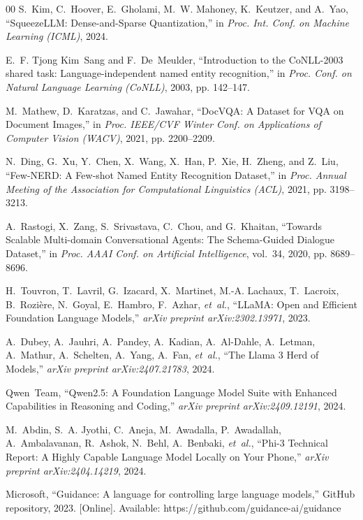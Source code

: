 \documentclass[conference]{IEEEtran}
\begin{document}
{\begin{thebibliography}{00}
S.~Kim, C.~Hoover, E.~Gholami, M.~W. Mahoney, K.~Keutzer, and A.~Yao, ``SqueezeLLM: Dense-and-Sparse Quantization,'' in \emph{Proc. Int. Conf. on Machine Learning (ICML)}, 2024.

E.~F. Tjong Kim~Sang and F.~De~Meulder, ``Introduction to the CoNLL-2003 shared task: Language-independent named entity recognition,'' in \emph{Proc. Conf. on Natural Language Learning (CoNLL)}, 2003, pp. 142--147.

M.~Mathew, D.~Karatzas, and C.~Jawahar, ``DocVQA: A Dataset for VQA on Document Images,'' in \emph{Proc. IEEE/CVF Winter Conf. on Applications of Computer Vision (WACV)}, 2021, pp. 2200--2209.

N.~Ding, G.~Xu, Y.~Chen, X.~Wang, X.~Han, P.~Xie, H.~Zheng, and Z.~Liu, ``Few-NERD: A Few-shot Named Entity Recognition Dataset,'' in \emph{Proc. Annual Meeting of the Association for Computational Linguistics (ACL)}, 2021, pp. 3198--3213.

A.~Rastogi, X.~Zang, S.~Srivastava, C.~Chou, and G.~Khaitan, ``Towards Scalable Multi-domain Conversational Agents: The Schema-Guided Dialogue Dataset,'' in \emph{Proc. AAAI Conf. on Artificial Intelligence}, vol.~34, 2020, pp. 8689--8696.

H.~Touvron, T.~Lavril, G.~Izacard, X.~Martinet, M.-A. Lachaux, T.~Lacroix, B.~Rozi{\`e}re, N.~Goyal, E.~Hambro, F.~Azhar, \emph{et~al.}, ``LLaMA: Open and Efficient Foundation Language Models,'' \emph{arXiv preprint arXiv:2302.13971}, 2023.

A.~Dubey, A.~Jauhri, A.~Pandey, A.~Kadian, A.~Al-Dahle, A.~Letman, A.~Mathur, A.~Schelten, A.~Yang, A.~Fan, \emph{et~al.}, ``The Llama 3 Herd of Models,'' \emph{arXiv preprint arXiv:2407.21783}, 2024.

Qwen~Team, ``Qwen2.5: A Foundation Language Model Suite with Enhanced Capabilities in Reasoning and Coding,'' \emph{arXiv preprint arXiv:2409.12191}, 2024.

M.~Abdin, S.~A. Jyothi, C.~Aneja, M.~Awadalla, P.~Awadallah, A.~Ambalavanan, R.~Ashok, N.~Behl, A.~Benbaki, \emph{et~al.}, ``Phi-3 Technical Report: A Highly Capable Language Model Locally on Your Phone,'' \emph{arXiv preprint arXiv:2404.14219}, 2024.

Microsoft, ``Guidance: A language for controlling large language models,'' GitHub repository, 2023. [Online]. Available: https://github.com/guidance-ai/guidance


\end{thebibliography}}
\end{document}
